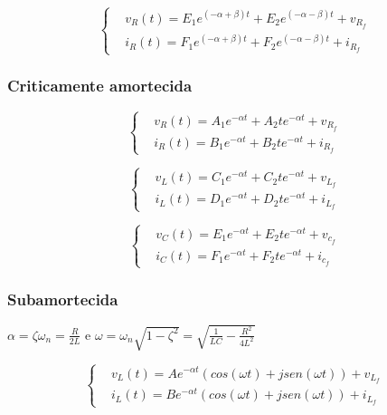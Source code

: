 \documentclass[12pt,fleqn]{book} %
\begin{document}
{\begin{equation}
\left\{\begin{aligned} & 
        v_R(t) = E_1e^{(-\alpha + \beta)t} + E_2e^{(-\alpha - \beta)t} + v_{R_f}\\&       
        i_R(t) = F_1e^{(-\alpha + \beta)t} + F_2e^{(-\alpha - \beta)t} + i_{R_f}
    \end{aligned}\right.
\end{equation}
            
            \subsubsection{Criticamente amortecida}

\begin{equation}
\left\{\begin{aligned} & 
        v_R(t) = A_1e^{-\alpha t} + A_2te^{-\alpha t} + v_{R_f}\\&       
        i_R(t) = B_1e^{-\alpha t} + B_2te^{-\alpha t} + i_{R_f}
    \end{aligned}\right.
\end{equation}  

\begin{equation}
\left\{\begin{aligned} & 
        v_L(t) = C_1e^{-\alpha t} + C_2te^{-\alpha t} + v_{L_f}\\&       
        i_L(t) = D_1e^{-\alpha t} + D_2te^{-\alpha t} + i_{L_f}
    \end{aligned}\right.
\end{equation}

\begin{equation}
\left\{\begin{aligned} & 
        v_C(t) = E_1e^{-\alpha t} + E_2te^{-\alpha t} + v_{c_f}\\&       
        i_C(t) = F_1e^{-\alpha t} + F_2te^{-\alpha t} + i_{c_f}
    \end{aligned}\right.
\end{equation}          
            
            \subsubsection{Subamortecida}


$\alpha = \zeta\omega_n = \frac{R}{2L}$ e $\omega = \omega_n\sqrt{1-\zeta^2} = \sqrt{\frac{1}{LC}-\frac{R^2}{4L^2}}$

\begin{equation}
\left\{\begin{aligned} & 
        v_L(t) = Ae^{-\alpha t}( cos(\omega t) + jsen(\omega t)) + v_{L_f}\\&       
        i_L(t) = Be^{-\alpha t}( cos(\omega t) + jsen(\omega t)) + i_{L_f}
    \end{aligned}\right.
\end{equation}

}
\end{document}
